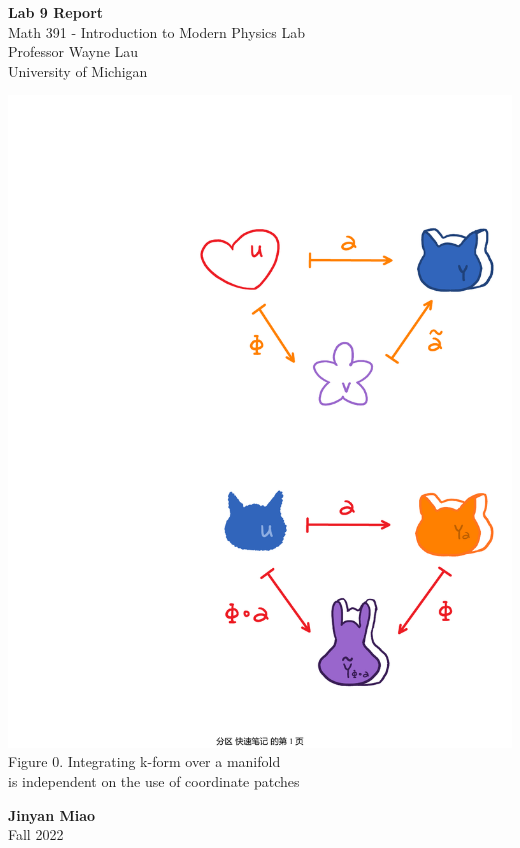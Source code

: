\documentclass[11pt]{book}
\theoremstyle{break}
\theoremstyle{break}
\begin{document}
	\begin{titlepage}
		\begin{center}
			\vspace*{1cm}
			\Huge \color{red}
				\textbf{Lab 9 Report}\\
			\vspace{0.5cm}			
			\Large \color{black}
				Math 391 - Introduction to Modern Physics Lab\\
				Professor Wayne Lau\\	
				University of Michigan\\
			\vspace{3cm}

			\includegraphics[scale=0.6]{Intkform1.pdf}\\
			\hfill\break
			\color{gray}Figure 0. Integrating k-form over a manifold\\is independent on the use of coordinate patches\color{black}
			
			
			
			\vspace{5cm}
			\LARGE
				\textbf{Jinyan Miao}\\
				\hfill\break
				\LARGE Fall 2022\\
			\vspace{1cm}

		\vspace*{\fill}
		\end{center}			
	\end{titlepage}
\end{document}

